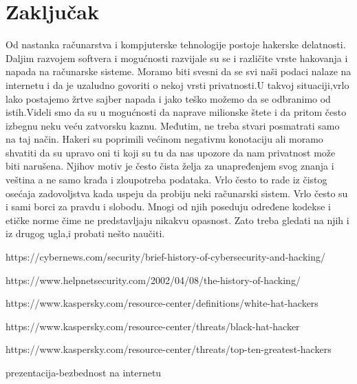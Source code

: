 \documentclass[a4paper]{article}
\begin{document}
\section{Zaključak}
\label{sec:zakljucak}
Od nastanka računarstva i kompjuterske tehnologije postoje hakerske delatnosti. Daljim razvojem softvera i mogućnosti razvijale su se i različite vrste hakovanja i napada na računarske sisteme. Moramo biti svesni da se svi naši podaci nalaze na internetu i da je uzaludno govoriti o nekoj vrsti privatnosti.U takvoj situaciji,vrlo lako postajemo žrtve sajber napada i jako teško možemo da se odbranimo od istih.Videli smo da su u mogućnosti da naprave milionske štete i da pritom često izbegnu neku veću zatvorsku kaznu.
\newline
Međutim, ne treba stvari posmatrati samo na taj način. Hakeri su poprimili većinom negativnu konotaciju ali moramo shvatiti da su upravo oni ti koji su tu da nas upozore da nam privatnost može biti narušena. Njihov motiv je često čista želja za unapređenjem svog znanja i veština a ne samo krađa i zloupotreba podataka. Vrlo često to rade iz čistog osećaja zadovoljstva kada uspeju da probiju neki računarski sistem. Vrlo često su i sami borci za pravdu i slobodu. Mnogi od njih poseduju određene kodekse i etičke norme čime ne predstavljaju nikakvu opasnost. Zato treba gledati na njih i iz drugog ugla,i probati nešto naučiti.
 

\newpage


\appendix

\begin{thebibliography}{9}

 https://cybernews.com/security/brief-history-of-cybersecurity-and-hacking/

 https://www.helpnetsecurity.com/2002/04/08/the-history-of-hacking/

 https://www.kaspersky.com/resource-center/definitions/white-hat-hackers

 https://www.kaspersky.com/resource-center/threats/black-hat-hacker

  https://www.kaspersky.com/resource-center/threats/top-ten-greatest-hackers

 prezentacija-bezbednost na internetu


\end{thebibliography}




\appendix
\end{document}
